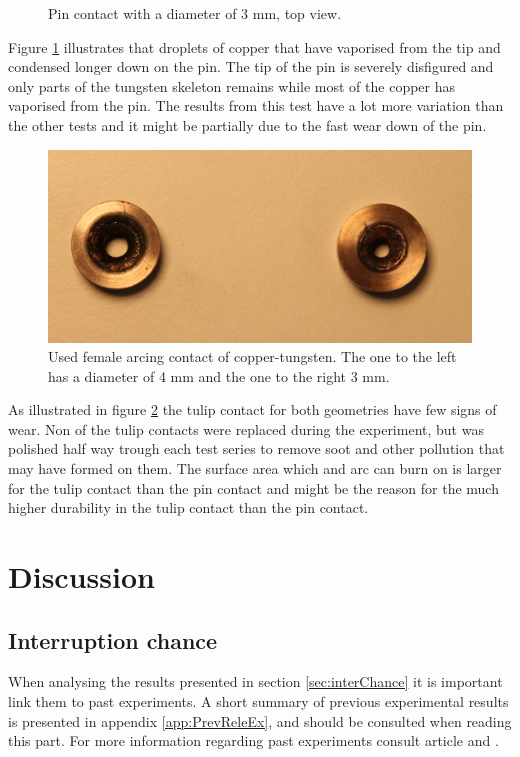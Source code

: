 \documentclass[10pt,a4paper,twoside]{article}
\begin{document}
\begin{figure}[H]
\begin{minipage}{.5\textwidth}
  \caption{Pin contact with a diameter of 3 mm, \newline top view.}
  \label{fig:d3_burn_top}
\end{minipage}
\end{figure}

Figure \ref{fig:d3_burn_top} illustrates that droplets of copper that have vaporised from the tip and condensed longer down on the pin. The tip of the pin is severely disfigured and only parts of the tungsten skeleton remains while most of the copper has vaporised from the pin. The results from this test have a lot more variation than the other tests and it might be partially due to the fast wear down of the pin.  


\begin{figure}[H]
\centering
\includegraphics[scale=0.4]{Bilder/Discussion/femaleContacts4mmand3mm.png}
\caption{Used female arcing contact of copper-tungsten. The one to the left has a diameter of 4 mm and the one to the right 3 mm.} \label{fig:used_d4_d3_female}
\end{figure}

As illustrated in figure \ref{fig:used_d4_d3_female} the tulip contact for both geometries have few signs of wear. Non of the tulip contacts were replaced during the experiment, but was polished half way trough each test series to remove soot and other pollution that may have formed on them. The surface area which and arc can burn on is larger for the tulip contact than the pin contact and might be the reason for the much higher durability in the tulip contact than the pin contact.

\cleardoublepage

\section{Discussion}
\subsection{Interruption chance} \label{sec:DiscIntChan}
When analysing the results presented in section \ref{sec:interChance} it is important link them to past experiments. A short summary of previous experimental results is presented in appendix \ref{app:PrevReleEx}, and should be consulted when reading this part. For more information regarding past experiments consult article \cite{bib:CIAMVLBS} and \cite{bib:AFIMVLBA}.
\end{document}
